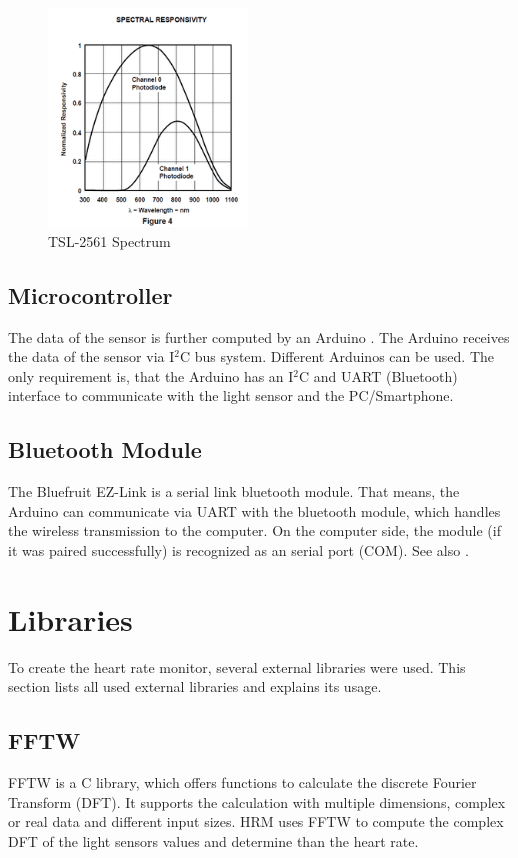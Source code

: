 \documentclass[oneside, notitlepage]{scrreprt}
\begin{document}
\begin{figure}[H]
	\centering
	\includegraphics[width=200px]{images/light_tsl2561spectrum.png}
	\caption{TSL-2561 Spectrum}
	\label{fig:tsl-2561-spectrum}
\end{figure}

\subsection{Microcontroller}
\label{subsec:microcontroller}
The data of the sensor is further computed by an Arduino \cite{bib:arduino-board}. The Arduino receives the data of the sensor via I$^{2}$C bus system. Different Arduinos can be used. The only requirement is, that the Arduino has an I$^{2}$C and UART (Bluetooth) interface to communicate with the light sensor and the PC/Smartphone.

\subsection{Bluetooth Module}
\label{subsec:bluetooth-adapter-hardware}
The Bluefruit EZ-Link is a serial link bluetooth module. That means, the Arduino can communicate via UART with the bluetooth module, which handles the wireless transmission to the computer. On the computer side, the module (if it was paired successfully) is recognized as an serial port (COM). See also \cite{bib:bluetooth-adapter}.

\section{Libraries}
To create the heart rate monitor, several external libraries were used. This section lists all used external libraries and explains its usage.

\subsection{FFTW}
FFTW is a C library, which offers functions to calculate the discrete Fourier Transform (DFT). It supports the calculation with multiple dimensions, complex or real data and different input sizes. HRM uses FFTW to compute the complex DFT of the light sensors values and determine than the heart rate.
\end{document}
